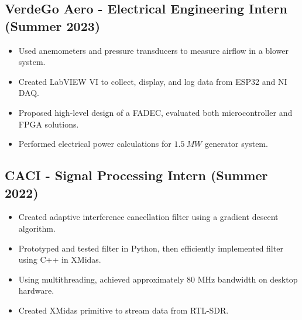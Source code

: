 \documentclass{article}
\newenvironment{CustomItemize}
{ \begin{itemize}[leftmargin=1em]
    \setlength{\itemsep}{0pt}
    \setlength{\parskip}{0pt}
    \setlength{\parindent}{0pt}
    \setlength{\parsep}{0pt}     }
{ \end{itemize}                  }
\begin{document}
\subsection{VerdeGo Aero - Electrical Engineering Intern (Summer 2023)}
\begin{CustomItemize}
\item Used anemometers and pressure transducers to measure airflow in a blower system.
\item Created LabVIEW VI to collect, display, and log data from ESP32 and NI DAQ.
\item Proposed high-level design of a FADEC, evaluated both microcontroller and FPGA solutions.
\item Performed electrical power calculations for $1.5\:MW$ generator system.
\end{CustomItemize}


\subsection{CACI - Signal Processing Intern (Summer 2022)}
\begin{CustomItemize}
\item Created adaptive interference cancellation filter using a gradient descent algorithm.
\item Prototyped and tested filter in Python, then efficiently implemented filter using C++ in XMidas.
\item Using multithreading, achieved approximately 80 MHz bandwidth on desktop hardware.
\item Created XMidas primitive to stream data from RTL-SDR.
\end{CustomItemize}
\end{document}
